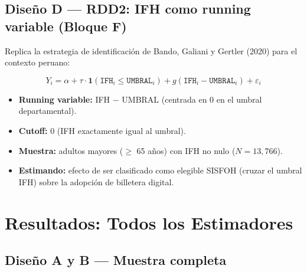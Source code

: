 \documentclass[12pt, a4paper]{article}
\begin{document}
\subsection{Diseño D — RDD2: IFH como running variable (Bloque F)}

Replica la estrategia de identificación de Bando, Galiani y Gertler (2020)
para el contexto peruano:

$$Y_i = \alpha + \tau \cdot \mathbf{1}(\texttt{IFH}_i \leq \texttt{UMBRAL}_i) + g(\texttt{IFH}_i - \texttt{UMBRAL}_i) + \varepsilon_i$$

\begin{itemize}[noitemsep]
  \item \textbf{Running variable:} IFH $-$ UMBRAL (centrada en 0 en el umbral
    departamental).
  \item \textbf{Cutoff:} 0 (IFH exactamente igual al umbral).
  \item \textbf{Muestra:} adultos mayores ($\geq$ 65 años) con IFH no nulo
    ($N = 13{,}766$).
  \item \textbf{Estimando:} efecto de ser clasificado como elegible SISFOH
    (cruzar el umbral IFH) sobre la adopción de billetera digital.
\end{itemize}

\section{Resultados: Todos los Estimadores}

\subsection{Diseño A y B — Muestra completa}
\end{document}

